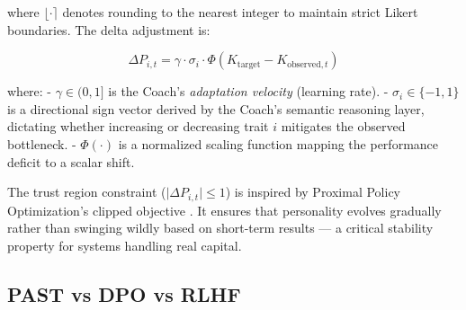 \documentclass[11pt]{article}
\begin{document}
where \(\lfloor \cdot \rceil\) denotes rounding to the nearest integer to maintain strict Likert boundaries. The delta adjustment is:

\[\Delta P_{i, t} = \gamma \cdot \sigma_i \cdot \Phi\left( K_{\text{target}} - K_{\text{observed}, t} \right)\]

where: - \(\gamma \in (0, 1]\) is the Coach's \emph{adaptation velocity} (learning rate). - \(\sigma_i \in \{-1, 1\}\) is a directional sign vector derived by the Coach's semantic reasoning layer, dictating whether increasing or decreasing trait \(i\) mitigates the observed bottleneck. - \(\Phi(\cdot)\) is a normalized scaling function mapping the performance deficit to a scalar shift.

The trust region constraint (\(\lvert \Delta P_{i,t} \rvert \leq 1\)) is inspired by Proximal Policy Optimization's clipped objective \citep{schulman2017ppo}. It ensures that personality evolves gradually rather than swinging wildly based on short-term results --- a critical stability property for systems handling real capital.

\subsection{PAST vs DPO vs RLHF}\label{past-vs-dpo-vs-rlhf}
\end{document}
